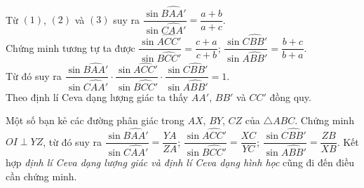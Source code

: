 \begin{bt}
{{\begin{align*}
\end{align*}}
Từ $(1)$, $(2)$ và $(3)$ suy ra $\dfrac{\sin\widehat{BAA'}}{\sin\widehat{CAA'}}=\dfrac{a+b}{a+c}$.\\
Chứng minh tương tự ta được $\dfrac{\sin\widehat{ACC'}}{\sin\widehat{BCC'}}=\dfrac{c+a}{c+b}$; $\dfrac{\sin\widehat{CBB'}}{\sin\widehat{ABB'}}=\dfrac{b+c}{b+a}$.\\
Từ đó suy ra $\dfrac{\sin\widehat{BAA'}}{\sin\widehat{CAA'}}\cdot\dfrac{\sin\widehat{ACC'}}{\sin\widehat{BCC'}}\cdot\dfrac{\sin\widehat{CBB'}}{\sin\widehat{ABB'}}=1$.\\
Theo định lí Ceva dạng lượng giác ta thấy $AA'$, $BB'$ và $CC'$ đồng quy.
\begin{nx}
Một số bạn kẻ các đường phân giác trong $AX$, $BY$, $CZ$ của $\triangle ABC$. Chứng minh $OI\perp YZ$, từ đó suy ra $\dfrac{\sin\widehat{BAA'}}{\sin\widehat{CAA'}}=\dfrac{YA}{ZA}$; $\dfrac{\sin\widehat{ACC'}}{\sin\widehat{BCC'}}=\dfrac{XC}{YC}$; $\dfrac{\sin\widehat{CBB'}}{\sin\widehat{ABB'}}=\dfrac{ZB}{XB}$. Kết hợp \textit{định lí Ceva dạng lượng giác và định lí Ceva dạng hình học} cũng đi đến điều cần chứng minh.
\end{nx}
}
\end{bt}

